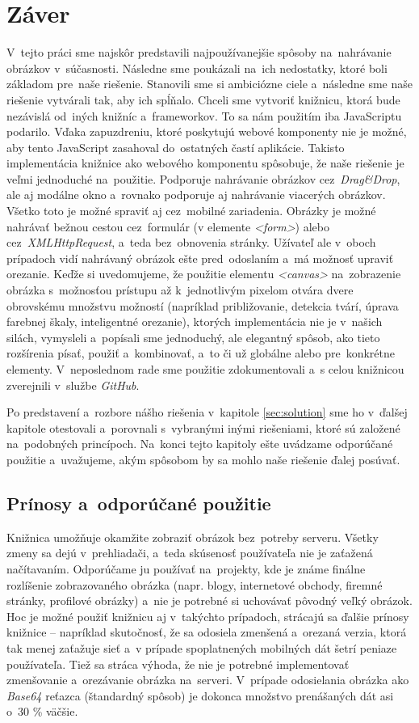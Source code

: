 \chapter{Záver}
V~tejto práci sme najskôr predstavili najpoužívanejšie spôsoby na~nahrávanie obrázkov v~súčasnosti. Následne sme poukázali na~ich nedostatky, ktoré boli základom pre~naše riešenie. Stanovili sme si ambiciózne ciele a~následne sme naše riešenie vytvárali tak, aby ich spĺňalo.
Chceli sme vytvoriť knižnicu, ktorá bude nezávislá od~iných knižníc a~frameworkov. To sa nám použitím iba JavaScriptu podarilo. Vďaka zapuzdreniu, ktoré poskytujú webové komponenty nie je možné, aby tento JavaScript zasahoval do~ostatných častí aplikácie. Takisto implementácia knižnice ako webového  komponentu spôsobuje, že naše riešenie je veľmi jednoduché na~použitie.
Podporuje nahrávanie obrázkov cez~\emph{Drag\&Drop}, ale aj modálne okno a~rovnako podporuje aj nahrávanie viacerých obrázkov. Všetko toto je možné spraviť aj cez~mobilné zariadenia. Obrázky je možné nahrávať bežnou cestou cez~formulár (v elemente \emph{<form>}) alebo cez~\emph{XMLHttpRequest}, a~teda bez~obnovenia stránky. Užívateľ ale v~oboch prípadoch vidí nahrávaný obrázok ešte pred~odoslaním a~má možnosť upraviť orezanie.
Keďže si uvedomujeme, že použitie elementu \emph{<canvas>} na~zobrazenie obrázka s~možnosťou prístupu až k~jednotlivým pixelom otvára dvere obrovskému množstvu možností (napríklad približovanie, detekcia tvárí, úprava farebnej škaly, inteligentné orezanie), ktorých implementácia nie je v~našich silách, vymysleli a~popísali sme jednoduchý, ale elegantný spôsob, ako tieto rozšírenia písať, použiť a~kombinovať, a~to či už globálne alebo pre~konkrétne elementy. V~neposlednom rade sme použitie zdokumentovali a~s celou knižnicou zverejnili v~službe \emph{GitHub}.

Po predstavení a~rozbore nášho riešenia v~kapitole \ref{sec:solution} sme ho v~ďalšej kapitole otestovali a~porovnali s~vybranými inými riešeniami, ktoré sú založené na~podobných princípoch. Na~konci tejto kapitoly ešte uvádzame odporúčané použitie a~uvažujeme, akým spôsobom by sa mohlo naše riešenie ďalej posúvať. 


\section{Prínosy a~odporúčané použitie}

Knižnica umožňuje okamžite zobraziť obrázok bez~potreby serveru. Všetky zmeny sa dejú v~prehliadači, a~teda skúsenosť používateľa nie je zaťažená načítavaním. Odporúčame ju používať na~projekty, kde je známe finálne rozlíšenie zobrazovaného obrázka (napr. blogy, internetové obchody, firemné stránky, profilové obrázky) a~nie je potrebné si uchovávať pôvodný veľký obrázok. Hoc je možné použiť knižnicu aj v~takýchto prípadoch, strácajú sa ďalšie prínosy knižnice -- napríklad skutočnosť, že sa odosiela zmenšená a~orezaná verzia, ktorá tak menej zaťažuje sieť a~v prípade spoplatnených mobilných dát šetrí peniaze používateľa. Tiež sa stráca výhoda, že nie je potrebné implementovať zmenšovanie a~orezávanie obrázka na~serveri. V~prípade odosielania obrázka ako \emph{Base64} reťazca (štandardný spôsob) je dokonca množstvo prenášaných dát asi o~30 \% väčšie.



